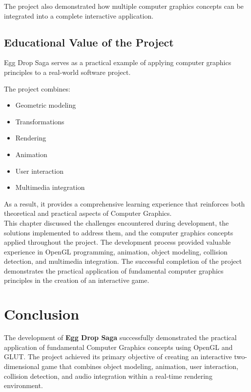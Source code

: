 \documentclass[12pt,a4paper]{report}
\begin{document}
The project also demonstrated how multiple computer graphics concepts can be integrated into a complete interactive application.

\section{Educational Value of the Project}

Egg Drop Saga serves as a practical example of applying computer graphics principles to a real-world software project.

The project combines:

\begin{itemize}
\item Geometric modeling
\item Transformations
\item Rendering
\item Animation
\item User interaction
\item Multimedia integration
\end{itemize}

As a result, it provides a comprehensive learning experience that reinforces both theoretical and practical aspects of Computer Graphics.\\


This chapter discussed the challenges encountered during development, the solutions implemented to address them, and the computer graphics concepts applied throughout the project. The development process provided valuable experience in OpenGL programming, animation, object modeling, collision detection, and multimedia integration. The successful completion of the project demonstrates the practical application of fundamental computer graphics principles in the creation of an interactive game.





\chapter{Conclusion}


The development of \textbf{Egg Drop Saga} successfully demonstrated the practical application of fundamental Computer Graphics concepts using OpenGL and GLUT. The project achieved its primary objective of creating an interactive two-dimensional game that combines object modeling, animation, user interaction, collision detection, and audio integration within a real-time rendering environment.\\
\end{document}
